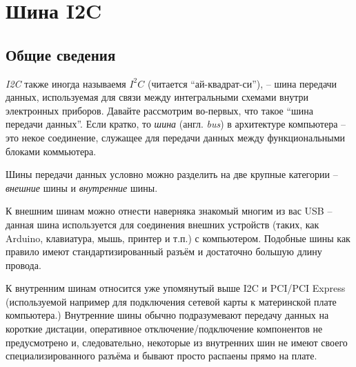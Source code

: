 \documentclass[../sparc.tex]{subfiles}
\begin{document}
\section{Шина I2C}
\label{section:i2c}




\subsection{Общие сведения}

\textit{\gls{I2C}} также иногда называемя $I^{2}C$ (читается ``ай-квадрат-си''),
-- шина передачи данных, используемая для связи между интегральными схемами
внутри электронных приборов. Давайте рассмотрим во-первых, что такое ``шина
передачи данных''. Если кратко, то \textit{шина} (англ. \textit{bus}) в
архитектуре компьютера -- это некое соединение, служащее для передачи данных
между функциональными блоками коммьютера.

Шины передачи данных условно можно разделить на две крупные категории --
\textit{внешние} шины и \textit{внутренние} шины.

К внешним шинам можно отнести наверняка знакомый многим из вас \gls{USB} --
данная шина используется для соединения внешних устройств (таких, как Arduino,
клавиатура, мышь, принтер и т.п.) с компьютером.  Подобные шины как правило
имеют стандартизированный разъём и достаточно большую длину провода.

К внутренним шинам относится уже упомянутый выше \gls{I2C} и \gls{PCI}/PCI
Express (используемой например для подключения сетевой карты к материнской плате
компьютера.)  Внутренние шины обычно подразумевают передачу данных на короткие
дистации, оперативное отключение/подключение компонентов не предусмотрено и,
следовательно, некоторые из внутренних шин не имеют своего специализированного
разъёма и бывают просто распаены прямо на плате.
\end{document}
